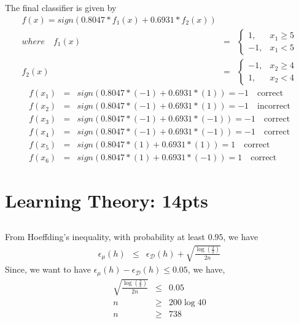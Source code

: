 \documentclass[12pt]{article}
\begin{document}
\subsection{}
The final classifier is given by
\begin{eqnarray}
    f(x) = sign(0.8047 * f_1(x) + 0.6931 * f_2(x)) \nonumber \\
    where \quad f_1(x) &=& \begin{cases}
        1, & x_1 \ge 5 \\
        -1, & x_1 < 5
        \end{cases} \nonumber \\
    f_2(x) &=& \begin{cases}
        -1, & x_2 \ge 4 \\
        1, & x_2 < 4
        \end{cases} \nonumber
\end{eqnarray}
\begin{eqnarray}
    f(x_1) &=& sign(0.8047*(-1) + 0.6931*(1)) = -1 \quad \text{correct}\nonumber \\
    f(x_2) &=& sign(0.8047*(-1) + 0.6931*(1)) = -1 \quad \text{incorrect} \nonumber \\
    f(x_3) &=& sign(0.8047*(-1) + 0.6931*(-1)) = -1 \quad \text{correct} \nonumber \\
    f(x_4) &=& sign(0.8047*(-1) + 0.6931*(-1)) = -1 \quad \text{correct} \nonumber \\
    f(x_5) &=& sign(0.8047*(1) + 0.6931*(1)) = 1 \quad \text{correct} \nonumber \\
    f(x_6) &=& sign(0.8047*(1) + 0.6931*(-1)) = 1 \quad \text{correct} \nonumber
\end{eqnarray}

\newpage

\section{Learning Theory: 14pts}
\subsection{}
From Hoeffding's inequality, with probability at least $0.95$, we have
\begin{eqnarray}
    \epsilon_{\mu}(h) &\le& \epsilon_{\mathcal{D}}(h) + \sqrt{\frac{\log(\frac{2}{\delta})}{2n}} \nonumber
\end{eqnarray}
Since, we want to have $\epsilon_{\mu}(h) - \epsilon_{\mathcal{D}}(h) \le 0.05$, we have,
\begin{eqnarray}
    \sqrt{\frac{\log(\frac{2}{\delta})}{2n}} &\le& 0.05 \nonumber \\
    n &\ge& 200 \log 40 \nonumber \\
    n &\ge& 738 \nonumber
\end{eqnarray}
\end{document}
